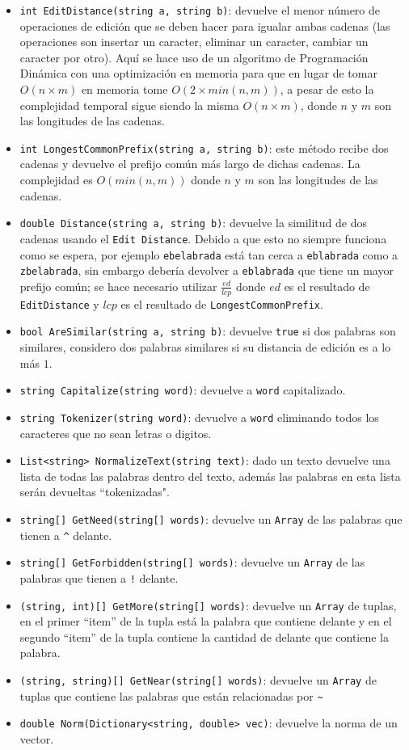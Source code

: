 \documentclass[a4paper, 12pt]{report}
\begin{document}
\begin{itemize}
	\item {\tt int EditDistance(string a, string b)}:  devuelve el menor número de operaciones de edición
	      que se deben hacer para igualar ambas cadenas (las operaciones son insertar un caracter, eliminar un caracter,
	      cambiar un caracter por otro). Aquí se hace uso de un algoritmo de Programación Dinámica con una
	      optimización en memoria para que en lugar de tomar $O(n \times m)$ en memoria tome $O(2 \times min(n, m))$,
	      a pesar de esto la complejidad temporal sigue siendo la misma $O(n \times m)$, donde $n$ y $m$ son las longitudes de las cadenas.
	\item {\tt int LongestCommonPrefix(string a, string b)}: este método recibe dos cadenas y
	      devuelve el prefijo común más largo de dichas cadenas. La complejidad es $O(min(n, m))$ donde $n$ y $m$
	      son las longitudes de las cadenas.
	\item {\tt double Distance(string a, string b)}: devuelve la similitud de dos cadenas usando el {\tt Edit Distance}. Debido a que esto no siempre
				funciona como se espera, por ejemplo {\tt ebelabrada} está tan cerca a {\tt eblabrada} como a {\tt zbelabrada},
	      sin embargo debería devolver a {\tt eblabrada} que tiene un mayor prefijo común; se hace necesario utilizar
	      $\frac{ed}{lcp}$ donde $ed$ es el resultado de {\tt EditDistance} y $lcp$ es el resultado de {\tt LongestCommonPrefix}.
	\item {\tt bool AreSimilar(string a, string b)}: devuelve {\tt true} si dos palabras son similares, considero dos palabras
	      similares si su distancia de edición es a lo más $1$.
	\item {\tt string Capitalize(string word)}: devuelve a {\tt word} capitalizado.
	\item {\tt string Tokenizer(string word)}: devuelve a {\tt word} eliminando todos los caracteres que no sean letras o digitos.
	\item {\tt List<string> NormalizeText(string text)}: dado un texto devuelve una lista de todas las palabras dentro del texto,
	      además las palabras en esta lista serán devueltas ``tokenizadas".
	\item {\tt string[] GetNeed(string[] words)}: devuelve un {\tt Array} de las palabras que tienen a {\tt \^{}} delante.
	\item {\tt string[] GetForbidden(string[] words)}: devuelve un {\tt Array} de las palabras que tienen a {\tt !} delante.
	\item {\tt (string, int)[] GetMore(string[] words)}: devuelve un {\tt Array} de tuplas, en el primer ``item'' de la tupla
	      está la palabra que contiene {\tt *} delante y en el segundo ``item'' de la tupla contiene la cantidad de {\tt *} delante
	      que contiene la palabra.
	\item {\tt (string, string)[] GetNear(string[] words)}: devuelve un {\tt Array} de tuplas que contiene las palabras que están relacionadas por
	      {\tt \~{}}
	\item {\tt double Norm(Dictionary<string, double> vec)}: devuelve la norma de un vector.
\end{itemize}
\end{document}
